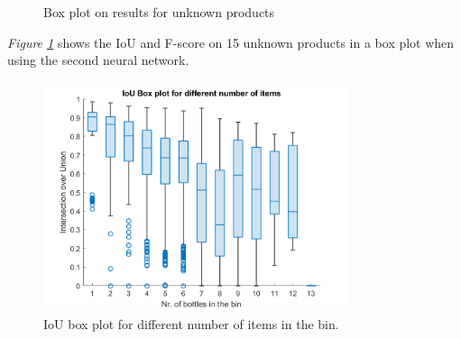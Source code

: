 \clearpage

\begin{figure}[h]
 \centering
 \hfill
 
 \caption{Box plot on results for unknown products}
 \label{fig:v2unknowniou}
\end{figure}

\textit{Figure \ref{fig:v2unknowniou}} shows the IoU and F-score on 15 unknown products in a box plot when using the second neural network.

\begin{figure}[h]
 \centering
 \includegraphics[width=0.8\textwidth]{graphics/results/v2boxplotBottles.png}
 \caption{IoU box plot for different number of items in the bin.}
 \label{fig:v2bottles}
\end{figure}

